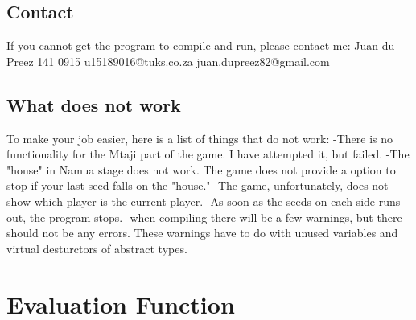 \documentclass[a4paper]{article}
\begin{document}
	
	\subsection{Contact}
	If you cannot get the program to compile and run, please contact me: \newline
	Juan du Preez 141 0915\newline
	u15189016@tuks.co.za\newline
	juan.dupreez82@gmail.com
	
	\subsection{What does not work}
	To make your job easier, here is a list of things that do not work: \newline
	-There is no functionality for the Mtaji part of the game. I have attempted it, but failed. \newline
	-The "house" in Namua stage does not work. The game does not provide a option to stop if your last seed falls on the 				"house."\newline
	-The game, unfortunately, does not show which player is the current player.\newline
	-As soon as the seeds on each side runs out, the program stops.\newline
	-when compiling there will be a few warnings, but there should not be any errors. These warnings have to do with unused 			variables and virtual desturctors of abstract types.
	
	

\section{Evaluation Function}
\end{document}
